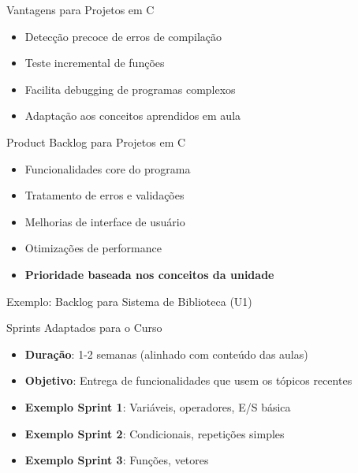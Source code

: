 \documentclass[10pt]{beamer}
\begin{document}
\begin{frame}{Vantagens para Projetos em C}
\begin{itemize}
    \item Detecção precoce de erros de compilação
    \item Teste incremental de funções
    \item Facilita debugging de programas complexos
    \item Adaptação aos conceitos aprendidos em aula
\end{itemize}
\end{frame}

\begin{frame}{Product Backlog para Projetos em C}
\begin{itemize}
    \item Funcionalidades core do programa
    \item Tratamento de erros e validações
    \item Melhorias de interface de usuário
    \item Otimizações de performance
    \item \textbf{Prioridade baseada nos conceitos da unidade}
\end{itemize}
\end{frame}

\begin{frame}{Exemplo: Backlog para Sistema de Biblioteca (U1)}
\centering
{}
\end{frame}

\begin{frame}{Sprints Adaptados para o Curso}
\begin{itemize}
    \item \textbf{Duração}: 1-2 semanas (alinhado com conteúdo das aulas)
    \item \textbf{Objetivo}: Entrega de funcionalidades que usem os tópicos recentes
    \item \textbf{Exemplo Sprint 1}: Variáveis, operadores, E/S básica
    \item \textbf{Exemplo Sprint 2}: Condicionais, repetições simples
    \item \textbf{Exemplo Sprint 3}: Funções, vetores
\end{itemize}
\end{frame}
\end{document}
